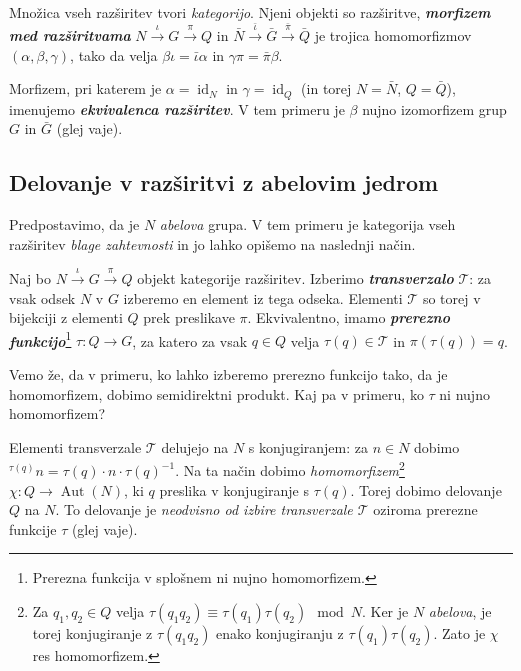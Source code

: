 \documentclass[11pt]{book}
\DeclareMathOperator\Aut{Aut}
\DeclareMathOperator\id{id}
\def\definicija{\color{rdeca}\bf\em}
\def\vprasanje{\color{oranzna}}
\def\literatura{\color{modra}}
\def\vaje{{\literatura (glej vaje)}}
\theoremstyle{definition}
\theoremstyle{zgled}
\theoremstyle{odprtproblem}
\theoremstyle{domacanaloga}
\theoremstyle{izrek}
\begin{document}
Množica vseh razširitev tvori {\em kategorijo}. Njeni objekti so razširitve, {\definicija morfizem med razširitvama} $N \xrightarrow{\iota} G \xrightarrow{\pi} Q$ in $\bar N \xrightarrow{\bar \iota} \bar G \xrightarrow{\bar \pi} \bar Q$ je trojica homomorfizmov $(\alpha, \beta, \gamma)$, tako da velja $\beta \iota = \bar \iota \alpha$ in $\gamma \pi = \bar \pi \beta$.


Morfizem, pri katerem je $\alpha = \id_N$ in $\gamma = \id_Q$ (in torej $N = \bar N$, $Q = \bar Q$), imenujemo {\definicija ekvivalenca razširitev}. V tem primeru je $\beta$ nujno izomorfizem grup $G$ in $\bar G$ \vaje.

\subsection{Delovanje v razširitvi z abelovim jedrom}

Predpostavimo, da je $N$ {\em abelova} grupa. V tem primeru je kategorija vseh razširitev {\em blage zahtevnosti} in jo lahko opišemo na naslednji način.

Naj bo $N \xrightarrow{\iota} G \xrightarrow{\pi} Q$ objekt kategorije razširitev. Izberimo {\definicija transverzalo} $\mathcal{T}$: za vsak odsek $N$ v $G$ izberemo en element iz tega odseka. Elementi $\mathcal{T}$ so torej v bijekciji z elementi $Q$ prek preslikave $\pi$. Ekvivalentno, imamo {\definicija prerezno funkcijo}\footnote{Prerezna funkcija v splošnem ni nujno homomorfizem.} $\tau \colon Q \to G$, za katero za vsak $q \in Q$ velja $\tau(q) \in \mathcal{T}$ in $\pi(\tau(q)) = q$. 

Vemo že, da v primeru, ko lahko izberemo prerezno funkcijo tako, da je homomorfizem, dobimo semidirektni produkt. {\vprasanje Kaj pa v primeru, ko $\tau$ ni nujno homomorfizem?}

Elementi transverzale $\mathcal{T}$ delujejo na $N$ s konjugiranjem: za $n\in N$ dobimo ${}^{\tau(q)} n =  \tau(q) \cdot n \cdot \tau(q)^{-1}$. Na ta način dobimo {\em homomorfizem}\footnote{Za $q_1, q_2 \in Q$ velja $\tau(q_1 q_2) \equiv \tau(q_1) \tau(q_2) \mod{N}$. Ker je $N$ {\em abelova}, je torej konjugiranje z $\tau(q_1 q_2)$ enako konjugiranju z $\tau(q_1)\tau(q_2)$. Zato je $\chi$ res homomorfizem.} $\chi \colon Q \to \Aut(N)$, ki $q$ preslika v konjugiranje s $\tau(q)$. Torej dobimo delovanje $Q$ na $N$. To delovanje je {\em neodvisno od izbire transverzale $\mathcal{T}$} oziroma prerezne funkcije $\tau$ \vaje.
\end{document}

